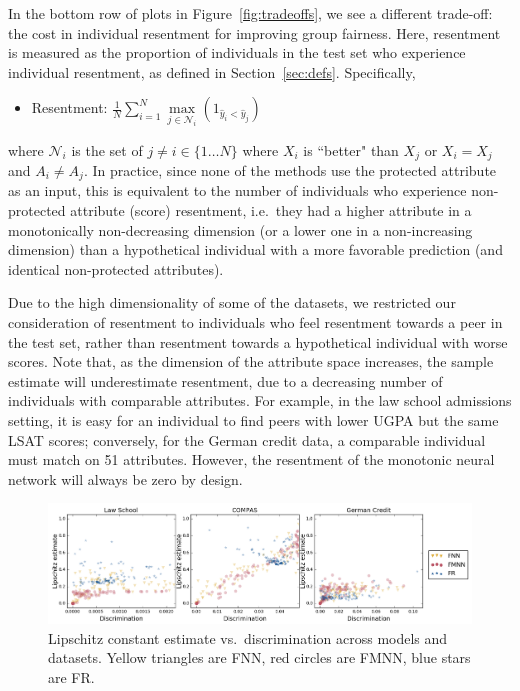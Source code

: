         In the bottom row of plots in Figure~\ref{fig:tradeoffs}, we see a different trade-off: the cost in individual resentment for improving group fairness.  Here, resentment is measured as the proportion of individuals in the test set who experience individual resentment, as defined in Section~\ref{sec:defs}. Specifically,
        \begin{itemize}
            \item Resentment: $ \frac1N \sum_{i=1}^N \max\limits_{j \in \mathcal{N}_i} \left(1_{\hat{y}_i < \hat{y}_j}\right)$
        \end{itemize}
        where $\mathcal{N}_i$ is the set of $j \neq i \in \{1 \ldots N\}$ where $X_i$ is ``better" than $X_j$ or $X_i = X_j$ and $A_i\neq A_j$.
        In practice, since none of the methods use the protected attribute as an input, this is equivalent to the number of individuals who experience non-protected attribute (score) resentment, i.e.\ they had a higher attribute in a monotonically non-decreasing dimension (or a lower one in a non-increasing dimension) than a hypothetical individual with a more favorable prediction (and identical non-protected attributes). 
        
        Due to the high dimensionality of some of the datasets, we restricted our consideration of resentment to individuals who feel resentment towards a peer in the test set, rather than resentment towards a hypothetical individual with worse scores.   Note that, as the dimension of the attribute space increases, the sample estimate will underestimate resentment, due to a decreasing number of individuals with comparable attributes.  For example, in the law school admissions setting, it is easy for an individual to find peers with lower UGPA but the same LSAT scores; conversely, for the German credit data, a comparable individual must match on 51 attributes.  However, the resentment of the monotonic neural network will always be zero by design.  
        
        \begin{figure}[t!]
            \centering
            \includegraphics[width=\textwidth]{fig_monofair/lipschitz_vs_discrimination.png}
            \caption{Lipschitz constant estimate vs.~discrimination across models and datasets.  Yellow triangles are FNN, red circles are FMNN, blue stars are FR.}
            \label{fig:lipschitz}
        \end{figure}
    
